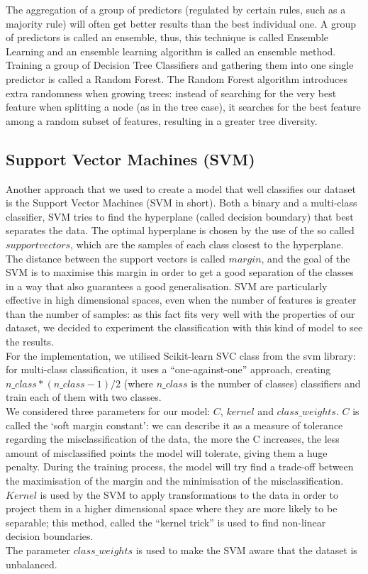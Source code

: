 \documentclass[12pt]{article}
\begin{document}
The aggregation of a group of predictors (regulated by certain rules, such as a majority rule) will often get better results than the best individual one. A group of predictors is called an ensemble, thus, this technique is called Ensemble Learning and an ensemble learning algorithm is called an ensemble method.
Training a group of Decision Tree Classifiers and gathering them into one single predictor is called a Random Forest.
The Random Forest algorithm introduces extra randomness when growing trees: instead of searching for the very best feature when splitting a node (as in the tree case), it searches for the best feature among a random subset of features, resulting in a greater tree diversity.


\subsection{Support Vector Machines (SVM)}
Another approach that we used to create a model that well classifies our dataset is the Support Vector Machines (SVM in short). Both a binary and a multi-class classifier, SVM tries to find the hyperplane (called decision boundary) that best separates the data. The optimal hyperplane is chosen by the use of the so called $support vectors$, which are the samples of each class closest to the hyperplane. The distance between the support vectors is called $margin$, and the goal of the SVM is to maximise this margin in order to get a good separation of the classes in a way that also guarantees a good generalisation. 
SVM are particularly effective in high dimensional spaces, even when the number of features is greater than the number of samples: as this fact fits very well with the properties of our dataset, we decided to experiment the classification with this kind of model to see the results. \\
For the implementation, we utilised Scikit-learn SVC class from the svm library: for multi-class classification, it uses a “one-against-one” approach, creating $n\_class*(n\_class-1)/2$ (where $n\_class$ is the number of classes) classifiers and train each of them with two classes. \\
We considered three parameters for our model: $C$, $kernel$ and $class\_weights$. 
$C$ is called the ‘soft margin constant’: we can describe it as a measure of tolerance regarding the misclassification of the data, the more the C increases, the less amount of misclassified points the model will tolerate, giving them a huge penalty. During the training process, the model will try find a trade-off between the maximisation of the margin and the minimisation of the misclassification. 
$Kernel$ is used by the SVM to apply transformations to the data in order to project them in a higher dimensional space where they are more likely to be separable; this method, called the “kernel trick” is used to find non-linear decision boundaries. \\
The parameter $class\_weights$ is used to make the SVM aware that the dataset is unbalanced. 
\end{document}
